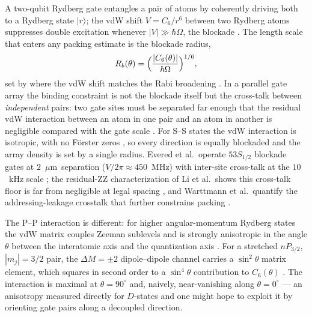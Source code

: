 \documentclass[twocolumn]{article}
\newcommand{\um}{$\mu$m}
\begin{document}
A two-qubit Rydberg gate entangles a pair of atoms by coherently driving both to a Rydberg state $|r\rangle$; the vdW shift $V=C_6/r^6$ between two Rydberg atoms suppresses double excitation whenever $|V|\gg\hbar\Omega$, the blockade \cite{Saffman2010,Low2012}. The length scale that enters any packing estimate is the blockade radius,
\begin{equation}
R_b(\theta)=\Bigl(\frac{|C_6(\theta)|}{\hbar\Omega}\Bigr)^{1/6},
\label{eq:rb}
\end{equation}
set by where the vdW shift matches the Rabi broadening \cite{Low2012,Browaeys2016}. In a parallel gate array the binding constraint is not the blockade itself but the cross-talk between \emph{independent} pairs: two gate sites must be separated far enough that the residual vdW interaction between an atom in one pair and an atom in another is negligible compared with the gate scale \cite{Levine2019,Evered2023,Li2026}. For S--S states the vdW interaction is isotropic, with no F\"orster zeros \cite{Walker2008,Saffman2010}, so every direction is equally blockaded and the array density is set by a single radius. Evered et al.\ operate $53S_{1/2}$ blockade gates at $2$~\um\ separation ($V/2\pi\approx450$~MHz) with inter-site cross-talk at the $10$~kHz scale \cite{Evered2023}; the residual-ZZ characterization of Li et al.\ shows this cross-talk floor is far from negligible at legal spacing \cite{Li2026}, and Warttmann et al.\ quantify the addressing-leakage crosstalk that further constrains packing \cite{Warttmann2026}.

The P--P interaction is different: for higher angular-momentum Rydberg states the vdW matrix couples Zeeman sublevels and is strongly anisotropic in the angle $\theta$ between the interatomic axis and the quantization axis \cite{Vermersch2015,Walker2008}. For a stretched $nP_{3/2}$, $|m_j|=3/2$ pair, the $\Delta M=\pm2$ dipole--dipole channel carries a $\sin^2\theta$ matrix element, which squares in second order to a $\sin^4\theta$ contribution to $C_6(\theta)$ \cite{Wadenpfuhl2025,Glaetzle2015,ParisMandoki2016}. The interaction is maximal at $\theta=90^\circ$ and, naively, near-vanishing along $\theta=0^\circ$ --- an anisotropy measured directly for $D$-states \cite{Barredo2014,Browaeys2016,Vybornyi2022} and one might hope to exploit it by orienting gate pairs along a decoupled direction.
\end{document}
